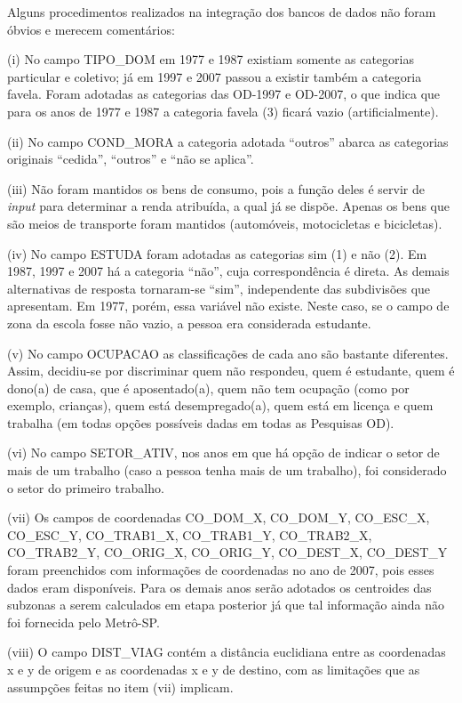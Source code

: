 Alguns procedimentos realizados na integração dos bancos de dados não foram óbvios e merecem comentários:
\begin{compactitem}[]
\item(i) No campo TIPO_DOM em 1977 e 1987 existiam somente as categorias particular e coletivo; já em 1997 e 2007 passou a existir também a categoria favela. Foram adotadas as categorias das OD-1997 e OD-2007, o que indica que para os anos de 1977 e 1987 a categoria favela (3) ficará vazio (artificialmente).
\item(ii) No campo COND_MORA a categoria adotada ``outros'' abarca as categorias originais ``cedida'', ``outros'' e ``não se aplica''.
\item(iii) Não foram mantidos os bens de consumo, pois a função deles é servir de \emph{input} para determinar a renda atribuída, a qual já se dispõe. Apenas os bens que são meios de transporte foram mantidos (automóveis, motocicletas e bicicletas).
\item (iv) No campo ESTUDA foram adotadas as categorias sim (1) e não (2). Em 1987, 1997 e 2007 há a categoria ``não'', cuja correspondência é direta. As demais alternativas de resposta tornaram-se ``sim'', independente das subdivisões que apresentam. Em 1977, porém, essa variável não existe. Neste caso, se o campo de zona da escola fosse não vazio, a pessoa era considerada estudante.
\item (v) No campo OCUPACAO as classificações de cada ano são bastante diferentes. Assim, decidiu-se por discriminar quem não respondeu, quem é estudante, quem é dono(a) de casa, que é aposentado(a), quem não tem ocupação (como por exemplo, crianças), quem está desempregado(a), quem está em licença e quem trabalha (em todas opções possíveis dadas em todas as Pesquisas OD).
\item(vi) No campo SETOR_ATIV, nos anos em que há opção de indicar o setor de mais de um trabalho (caso a pessoa tenha mais de um trabalho), foi considerado o setor do primeiro trabalho.
\item(vii) Os campos de coordenadas CO_DOM_X, CO_DOM_Y, CO_ESC_X, CO_ESC_Y, CO_TRAB1_X, CO_TRAB1_Y, CO_TRAB2_X, CO_TRAB2_Y, CO_ORIG_X, CO_ORIG_Y, CO_DEST_X, CO_DEST_Y foram preenchidos com informações de coordenadas no ano de 2007, pois esses dados eram disponíveis. Para os demais anos serão adotados os centroides das subzonas a serem calculados em etapa posterior já que tal informação ainda não foi fornecida pelo Metrô-SP.
\item(viii) O campo DIST_VIAG contém a distância euclidiana entre as coordenadas x e y de origem e as coordenadas x e y de destino, com as limitações que as assumpções feitas no item (vii) implicam.

\end{compactitem}
